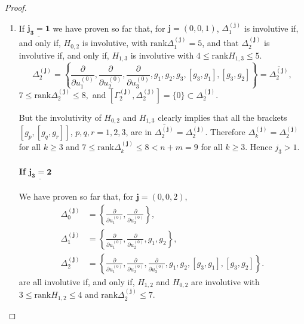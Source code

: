 \documentclass[10pt]{article}
\newcommand{\3}{\mathbf{3}}
\newcommand{\2}{\mathbf{2}}
\newcommand{\1}{\mathbf{1}}
\newcommand{\0}{\mathbf{0}}
\newcommand{\mbf}[1]{\mathbf{#1}}
\newcommand{\rk}{\mathrm{rank}}
\newcommand{\ddu}[2]{\frac{\partial}{\partial u_{#1}^{(#2)}}}
\newcommand{\ol}[1]{\overline{#1}}
\begin{document}
\begin{proof}
\begin{enumerate}
\paragraph{If $\underline{\mathbf{j_{3} \geq 3}}$}
$$\begin{aligned}
&\Gamma_{2}^{(\mbf{j})} = \left\{  \ddu{3}{j_{3}}, \ddu{3}{j_{3}-1}, \ddu{3}{j_{3}-2} \right\}, \\
&\Delta_{2}^{(\mbf{j})} = \left\{\ddu{1}{0}, \ddu{2}{0}, g_{1}, g_{2},  u_{2}^{(0)}[g_{2},g_{1}]+ u_{3}^{(0)}[g_{3},g_{1}], u_{1}^{(0)}[g_{1}, g_{2}] +  u_{3}^{(0)}[g_{3},g_{2}]\right\}.
\end{aligned}$$
Again, $\Delta_{2}^{(\mbf{j})}$ is involutive if, and only if, $H_{1,2}$ is involutive with  $3 \leq \rk H_{1,2} \leq 4$, in which case
$$\Delta_{2}^{(\mbf{j})} = \left\{\ddu{1}{0}, \ddu{2}{0},  g_{1}, g_{2}, [g_{3},g_{1}], [g_{3},g_{2}]\right\}  = \ol{\Delta_{2}^{(\mbf{j})}}, \quad 5\leq \rk \Delta_{2}^{(\mbf{j})} \leq 6$$
$$[\Gamma_{2}^{(\mbf{j})}, \Delta_{2}^{(\mbf{j})}] = \{ 0 \} \subset \Delta_{2}^{(\mbf{j})}.$$


\item[\framebox{\Large{$\mathbf{k=3}$}}]



If $\underline{\mathbf{j_{3}=1}}$
we have proven so far that, for $\mbf{j}=(0,0,1)$,
$\Delta_{1}^{(\mbf{j})}$ is involutive if, and only if, $H_{0,2}$ is involutive, with $\rk \Delta_{1}^{(\mbf{j})}= 5$,
and that
$\Delta_{2}^{(\mbf{j})}$ is involutive if, and only if, $H_{1,3}$ is involutive with
$4\leq \rk H_{1,3} \leq 5$.
$$\Delta_{2}^{(\mbf{j})} = \left\{\ddu{1}{0}, \ddu{2}{0}, \ddu{3}{0}, g_{1}, g_{2}, g_{3}, [g_{3},g_{1}], [g_{3},g_{2}]\right\} = \ol{\Delta_{2}^{(\mbf{j})} },$$
$7 \leq \rk \Delta_{2}^{(\mbf{j})} \leq 8,$ 
and $[\Gamma_{2}^{(\mbf{j})}, \Delta_{2}^{(\mbf{j})}] = \{ 0 \} \subset \Delta_{2}^{(\mbf{j})}.$

But the involutivity of $H_{0,2}$ and $H_{1,3}$ clearly implies that all the brackets $[g_{p},[g_{q},g_{r}]]$, $p,q,r = 1,2,3$, are in $\ol{\Delta_{2}^{(\mbf{j})}} = \Delta_{2}^{(\mbf{j})}$. Therefore $\Delta_{k}^{(\mbf{j})} = \Delta_{2}^{(\mbf{j})}$ for all $k\geq 3$ and $7 \leq \rk \Delta_{k}^{(\mbf{j})} \leq 8 <  n+m = 9$ for all $k\geq 3$. Hence $j_{3}>1$.
\paragraph{If $\underline{\mathbf{j_{3}= 2}}$}
We have proven so far that, for $\mbf{j}=(0,0,2)$,
$$\begin{aligned}
\Delta_{0}^{(\mbf{j})} &= \left\{\ddu{1}{0}, \ddu{2}{0}\right\},\\
\Delta_{1}^{(\mbf{j})} &= \left\{\ddu{1}{0}, \ddu{2}{0},  g_{1}, g_{2} \right\},\\
\Delta_{2}^{(\mbf{j})} &= \left\{\ddu{1}{0}, \ddu{2}{0}, \ddu{3}{0}, g_{1}, g_{2}, [g_{3},g_{1}], [g_{3},g_{2}]\right\}.
\end{aligned}$$
are all involutive if, and only if, $H_{1,2}$ and $H_{0,2}$  are involutive with 
\newline
$3 \leq \rk H_{1,2} \leq 4$ and $\rk \Delta_{2}^{(\mbf{j})} \leq 7$.


\end{enumerate}
\end{proof}
\end{document}
